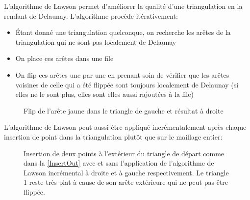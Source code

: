 L'algorithme de Lawson permet d'améliorer la qualité d'une triangulation en la rendant de Delaunay. L'algorithme procède itérativement:

\begin {itemize}
 \item {Étant donné une triangulation quelconque, on recherche les arêtes de la triangulation qui ne sont pas localement de Delaunay}
 \item {On place ces arêtes dans une file}
 \item {On flip ces arêtes une par une en prenant soin de vérifier que les arêtes voisines de celle qui a été flippée sont toujours localement de Delaunay (si elles ne le sont plus, elles sont elles aussi rajoutées à la file)}
\end {itemize}

\begin{figure}[h!]
	
	\caption{Flip de l'arête jaune dans le triangle de gauche et résultat à droite}
\end{figure}
\FloatBarrier

L'algorithme de Lawson peut aussi être appliqué incrémentalement après chaque insertion de point dans la triangulation plutôt que sur le maillage entier:

\begin{figure}[h!]
	
	\caption{Insertion de deux points à l'extérieur du triangle de départ comme dans la \figurename \ref{InsertOut} avec et sans l'application de l'algorithme de Lawson incrémental à droite et à gauche respectivement. Le triangle 1 reste très plat à cause de son arête extérieure qui ne peut pas être flippée.}
\end{figure}
\FloatBarrier

